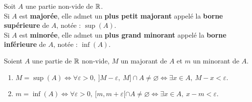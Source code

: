 \begin{theorem}
    Soit $A$ une partie non-vide de $\mathbb{R}$. \\
    Si $A$ est \textbf{majorée}, elle admet un \textbf{plus petit majorant} appelé la \textbf{borne supérieure} de $A$, notée : $\sup(A)$.
    \\
    Si $A$ est \textbf{minorée}, elle admet un \textbf{plus grand minorant} appelé la \textbf{borne inférieure} de $A$, notée : $\inf(A)$.
\end{theorem}

\begin{proposition}
    Soient $A$ une partie de $\mathbb{R}$ non-vide, $M$ un majorant de $A$ et $m$ un minorant de $A$.  
    \begin{enumerate}
        \item $M = \sup(A) \iff \forall \varepsilon > 0,\ ]M - \varepsilon,\ M] \cap A \neq \varnothing \iff \exists x \in A,\ M - x < \varepsilon$.
        \item $m = \inf(A) \iff \forall \varepsilon > 0,\ [m, m + \varepsilon[ \cap A \neq \varnothing \iff \exists x \in A,\ x - m < \varepsilon$.
    \end{enumerate}
\end{proposition}